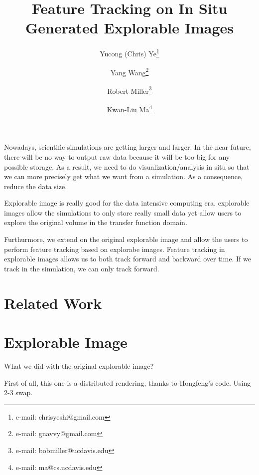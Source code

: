 \documentclass{vgtc}                          %
\title{Feature Tracking on In Situ Generated Explorable Images}
\author{Yucong (Chris) Ye\thanks{e-mail: chrisyeshi@gmail.com} %
\and Yang Wang\thanks{e-mail: gnavvy@gmail.com} %
\and Robert Miller\thanks{e-mail: bobmiller@ucdavis.edu} %
\and Kwan-Liu Ma\thanks{e-mail: ma@cs.ucdavis.edu}}
\affiliation{\scriptsize VIDi Lab \\ University of California, Davis}
\begin{document}


\maketitle


Nowadays, scientific simulations are getting larger and larger. In the near future, there will be no way to output raw data because it will be too big for any possible storage. As a result, we need to do visualization/analysis in situ so that we can more precisely get what we want from a simulation. As a consequence, reduce the data size.

Explorable image is really good for the data intensive computing era. explorable images allow the simulations to only store really small data yet allow users to explore the original volume in the transfer function domain.

Furthurmore, we extend on the original explorable image and allow the users to perform feature tracking based on explorabe images. Feature tracking in explorable images allows us to both track forward and backward over time. If we track in the simulation, we can only track forward.

\section{Related Work}

\cite{proxy,anna_eg_2010,anna_pv_2010,ma2007situ,hf_2010}

\section{Explorable Image}

What we did with the original explorable image?

First of all, this one is a distributed rendering, thanks to Hongfeng's code. Using 2-3 swap.
\end{document}
